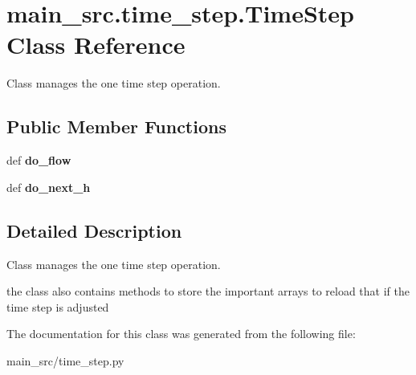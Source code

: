 \hypertarget{classmain__src_1_1time__step_1_1TimeStep}{\section{main\-\_\-src.\-time\-\_\-step.\-Time\-Step Class Reference}
\label{classmain__src_1_1time__step_1_1TimeStep}
}


Class manages the one time step operation.  


\subsection*{Public Member Functions}
\begin{DoxyCompactItemize}
\item 
\hypertarget{classmain__src_1_1time__step_1_1TimeStep_a56c505ef096abb9449fa07b8f6546292}{def {\bfseries do\-\_\-flow}}\label{classmain__src_1_1time__step_1_1TimeStep_a56c505ef096abb9449fa07b8f6546292}

\item 
\hypertarget{classmain__src_1_1time__step_1_1TimeStep_ad3463bccdbead550376e9f1890665d06}{def {\bfseries do\-\_\-next\-\_\-h}}\label{classmain__src_1_1time__step_1_1TimeStep_ad3463bccdbead550376e9f1890665d06}

\end{DoxyCompactItemize}


\subsection{Detailed Description}
Class manages the one time step operation. 

the class also contains methods to store the important arrays to reload that if the time step is adjusted 

The documentation for this class was generated from the following file\-:\begin{DoxyCompactItemize}
\item 
main\-\_\-src/time\-\_\-step.\-py\end{DoxyCompactItemize}
